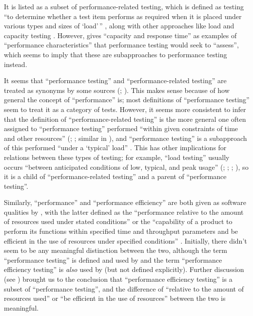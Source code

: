 It is listed as a subset of performance-related testing, which is defined as
testing ``to determine whether a test item performs as required when it is
placed under various types and sizes of `load'\,'' \citeyearpar[p.~38]{IEEE2021},
along with other approaches like load and capacity testing
\citep[p.~22]{IEEE2022}. However, \citet[p.~5-9]{SWEBOK2024}
gives ``capacity and response time'' as examples of ``performance
characteristics'' that performance testing would seek to ``assess'', which
seems to imply that these are subapproaches to performance testing instead.

It seems that ``performance testing'' and ``performance-related testing''
are treated as synonyms by some sources (\citealp[p.~5-9]{SWEBOK2024};
\citealp[p.~1187]{Moghadam2019}). This makes sense because of how general the
concept of ``performance'' is; most definitions of ``performance testing'' seem
to treat it as a category of tests. However, it seems more consistent to infer
that the definition of ``performance-related testing'' is the more general one
often assigned to ``performance testing'' performed ``within given constraints
of time and other resources'' (\citealp[p.~7]{IEEE2022};
\citeyear[p.~320]{IEEE2017}; similar in \citealp[p.~1187]{Moghadam2019}), and
``performance testing'' is a subapproach of this performed ``under a `typical'
load'' \citep[p.~39]{IEEE2021}. This has other implications for relations
between these types of testing; for example, ``load testing'' usually occurs
``between anticipated conditions of low, typical, and peak usage''
(\citealp[p.~5]{IEEE2022}; \citeyear[p.~39]{IEEE2021};
\citeyear[p.~253]{IEEE2017} ; \citealpISTQB{}), so it is a
child of ``performance-related testing'' and a parent of ``performance testing''.

Similarly, ``performance'' and ``performance efficiency'' are
both given as software qualities by \citeauthor{IEEE2017}, with the latter
defined as the ``performance relative to the amount
of resources used under stated conditions'' \citeyearpar[p.~319]{IEEE2017}
or the ``capability of a product to perform its functions within specified
time and throughput parameters and be efficient in the use of resources under
specified conditions'' \citep{ISO_IEC2023a}.
Initially, there didn't seem to be any meaningful distinction
between the two, although the term ``performance testing'' is defined
\citeyearpar[p.~320]{IEEE2017} and used by \citeauthor{IEEE2017} and
the term ``performance efficiency testing'' is \emph{also} used by
\citeauthor{IEEE2017} (but not defined explicitly). Further discussion (see
) brought us to the conclusion that ``performance
efficiency testing'' is a subset of ``performance testing'', and the
difference of ``relative to the amount of resources used'' or ``be efficient in
the use of resources'' between the two is meaningful.

